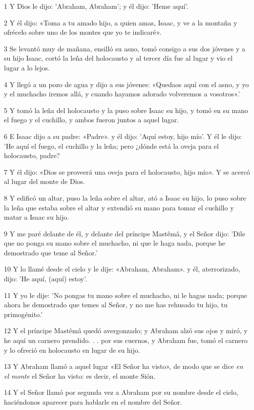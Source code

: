 \par 1 Y Dios le dijo: 'Abraham, Abraham'; y él dijo: 'Heme aquí'.
\par 2 Y él dijo: «Toma a tu amado hijo, a quien amas, Isaac, y ve a la montaña y ofrécelo sobre uno de los montes que yo te indicaré».
\par 3 Se levantó muy de mañana, ensilló su asno, tomó consigo a sus dos jóvenes y a su hijo Isaac, cortó la leña del holocausto y al tercer día fue al lugar y vio el lugar a lo lejos.
\par 4 Y llegó a un pozo de agua y dijo a sus jóvenes: «Quedaos aquí con el asno, y yo y el muchacho iremos allá, y cuando hayamos adorado volveremos a vosotros».'
\par 5 Y tomó la leña del holocausto y la puso sobre Isaac su hijo, y tomó en su mano el fuego y el cuchillo, y ambos fueron juntos a aquel lugar.
\par 6 E Isaac dijo a su padre: «Padre». y él dijo: 'Aquí estoy, hijo mío'. Y él le dijo: 'He aquí el fuego, el cuchillo y la leña; pero ¿dónde está la oveja para el holocausto, padre?
\par 7 Y él dijo: «Dios se proveerá una oveja para el holocausto, hijo mío». Y se acercó al lugar del monte de Dios.
\par 8 Y edificó un altar, puso la leña sobre el altar, ató a Isaac su hijo, lo puso sobre la leña que estaba sobre el altar y extendió su mano para tomar el cuchillo y matar a Isaac su hijo.
\par 9 Y me paré delante de él, y delante del príncipe Mastêmâ, y el Señor dijo: 'Dile que no ponga su mano sobre el muchacho, ni que le haga nada, porque he demostrado que teme al Señor.'
\par 10 Y lo llamé desde el cielo y le dije: «Abraham, Abraham». y él, aterrorizado, dijo: 'He aquí, (aquí) estoy'.
\par 11 Y yo le dije: 'No pongas tu mano sobre el muchacho, ni le hagas nada; porque ahora he demostrado que temes al Señor, y no me has rehusado tu hijo, tu primogénito.'
\par 12 Y el príncipe Mastêmâ quedó avergonzado; y Abraham alzó sus ojos y miró, y he aquí un carnero prendido. . . por sus cuernos, y Abraham fue, tomó el carnero y lo ofreció en holocausto en lugar de su hijo.
\par 13 Y Abraham llamó a aquel lugar «El Señor ha visto», de modo que se dice \textit{en el monte} el Señor ha visto: es decir, el monte Sión.
\par 14 Y el Señor llamó por segunda vez a Abraham por su nombre desde el cielo, haciéndonos aparecer para hablarle en el nombre del Señor.
